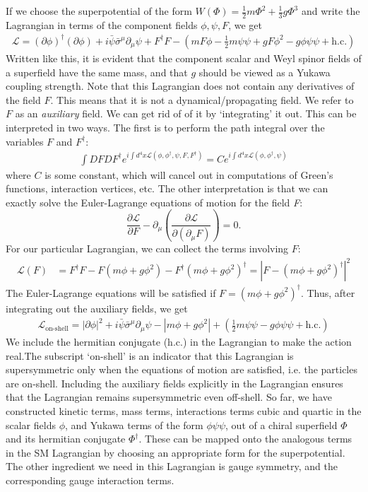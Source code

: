 If we choose the superpotential of the form $W(\Phi) = \frac{1}{2}m\Phi^2 + \frac{1}{3}g\Phi^3$ and write the Lagrangian in terms of the component fields $\phi,\psi,F$, we get
\begin{align*}
  \mathcal{L} = (\partial\phi)^\dagger(\partial\phi) + i\bar{\psi}\bar{\sigma}^\mu\partial_\mu\psi+F^\dagger F-\left(mF\phi-\frac{1}{2}m\psi\psi+gF\phi^2-g\phi\psi\psi + \text{h.c.}\right)
\end{align*}
Written like this, it is evident that the component scalar and Weyl spinor fields of a superfield have the same mass, and that $g$ should be viewed as a Yukawa coupling strength. Note that this Lagrangian does not contain any derivatives of the field $F$. This means that it is not a dynamical/propagating field. We refer to $F$ as an \emph{auxiliary} field. We can get rid of of it by `integrating' it out. This can be interpreted in two ways. The first is to perform the path integral over the variables $F$ and $F^\dagger$:
\begin{align*}
\int DFDF^\dagger e^{i\int d^4x \mathcal{L}(\phi,\phi^\dagger,\psi,F,F^\dagger)} = 
 C e^{i\int d^4x \mathcal{L}(\phi,\phi^\dagger,\psi)}
\end{align*}
where $C$ is some constant, which will cancel out in computations of Green's functions, interaction vertices, etc. The other interpretation is that we can exactly solve the Euler-Lagrange equations of motion for the field \emph{F}:
\[\frac{\partial\mathcal{L}}{\partial F}-\partial_\mu\left(\frac{\partial\mathcal{L}}{\partial(\partial_\mu F)}\right) = 0.\]
For our particular Lagrangian, we can collect the terms involving $F$:
\begin{align*}
\mathcal{L}(F) &= F^\dagger F - F(m\phi+g\phi^2) - F^\dagger(m\phi+g\phi^2)^\dagger= |F-(m\phi+g\phi^2)^\dagger|^2
\end{align*}
The Euler-Lagrange equations will be satisfied if $F = (m\phi+g\phi^2)^\dagger$. Thus, after integrating out the auxiliary fields, we get
\begin{align*}
  \mathcal{L}_\text{on-shell} = |\partial\phi|^2+ i\bar{\psi}\bar{\sigma}^\mu\partial_\mu\psi-|m\phi+g\phi^2|+\left(\frac{1}{2}m\psi\psi-g\phi\psi\psi + \text{h.c.}\right)
\end{align*}
We include the hermitian conjugate (h.c.) in the Lagrangian to make the action real.The subscript `on-shell' is an indicator that this Lagrangian is supersymmetric only when the equations of motion are satisfied, i.e. the particles are on-shell. Including the auxiliary fields explicitly in the Lagrangian ensures that the Lagrangian remains supersymmetric even off-shell. So far, we have constructed kinetic terms, mass terms, interactions terms cubic and quartic in the scalar fields $\phi$, and Yukawa terms of the form $\phi\psi\psi$, out of a chiral superfield $\Phi$ and its hermitian conjugate $\Phi^\dagger$. These can be mapped onto the analogous terms in the SM Lagrangian by choosing an appropriate form for the superpotential. The other ingredient we need in this Lagrangian is gauge symmetry, and the corresponding gauge interaction terms.
